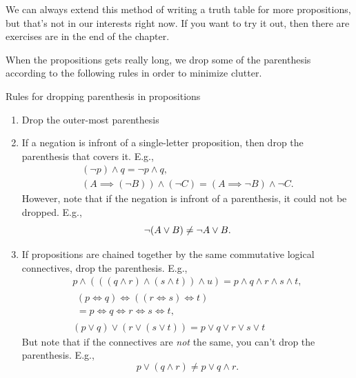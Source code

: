 We can always extend this method of writing a truth table for more propositions, but that's not in our interests right now. If you want to try it out, then there are exercises are in the end of the chapter.

When the propositions gets really long, we drop some of the parenthesis according to the following rules in order to minimize clutter.

\begin{notation}{Rules for dropping parenthesis in propositions}{}
  \begin{enumerate}[noitemsep]
    \item Drop the outer-most parenthesis
    \item If a negation is infront of a single-letter proposition, then drop the parenthesis that covers it. E.g.,
          \begin{gather}
            (\neg p) \land q = \neg p \land q, \\
            (A \implies (\neg B)) \land (\neg C) = (A \implies \neg B) \land \neg C.
          \end{gather}
          However, note that if the negation is infront of a parenthesis, it could not be dropped. E.g.,
          \begin{equation}
            \neg (A \lor B) \neq \neg A \lor B. \\
          \end{equation}
    \item If propositions are chained together by the same commutative logical connectives, drop the parenthesis. E.g.,
          \begin{gather}
            p \land (((q \land r) \land (s \land t)) \land u) = p \land q \land r \land s \land t, \\
            \begin{multlined}
              (p \iff q) \iff ((r \iff s) \iff t) \\ = p \iff q \iff r \iff s \iff t,
            \end{multlined} \\
            (p \lor q) \lor (r \lor (s \lor t)) = p \lor q \lor r \lor s \lor t
          \end{gather}
          But note that if the connectives are \emph{not} the same, you can't drop the parenthesis. E.g.,
          \begin{equation}
            p \lor (q \land r) \neq p \lor q \land r.
          \end{equation}
  \end{enumerate}
\end{notation}


